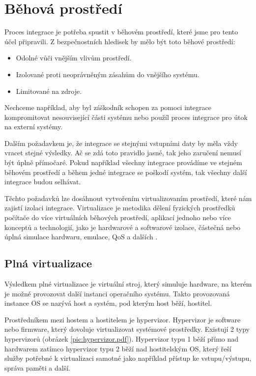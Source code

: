 \chapter{Běhová prostředí}

Proces integrace je potřeba spustit v běhovém prostředí, které jsme pro tento účel připravili.
Z bezpečnostních hledisek by mělo být toto běhové prostředí:

\begin{itemize}
	\item Odolné vůči vnějším vlivům prostředí.
	\item Izolované proti neoprávněným zásahům do vnějšího systému.
	\item Limitované na zdroje.
\end{itemize}

Nechceme například, aby byl záškodník schopen za pomoci integrace kompromitovat nesouvisející části systému nebo použíl proces integrace pro útok na externí systémy.

Dalším požadavkem je, že integrace se stejnými vstupními daty by měla vždy vracet stejné výsledky.
Ač se zdá toto pravidlo jasné, tak jeho zaručení nemusí být úplně přímočaré.
Pokud například všechny integrace provádíme ve stejném běhovém prostředí a během jedné integrace se poškodí systém, tak všechny další integrace budou selhávat.

Těchto požadavků lze dosáhnout vytvořením virtualizovaním prostředí, které nám zajistí izolaci integrace.
Virtualizace je metodika dělení fyzických prostředků počítače do více virtuálních běhových prostředí, aplikací jednoho nebo více konceptů a technologií, jako je hardwarové a softwarové izolace, částečná nebo úplná simulace hardwaru, emulace, QoS a dalších \cite{virt_intro}.

\section{Plná virtualizace}

Výsledkem plné virtualizace je virtuální stroj, který simuluje hardware, na kterém je možné provozovat další instanci operačního systému.
Takto provozovaná instance OS se nazývá host a systém, pod kterým host běží, hostitel.


Prostředníkem mezi hostem a hostitelem je hypervizor.
Hypervizor je software nebo firmware, který dovoluje virtualizovat systémové prostředky.
Existují 2 typy hypervizorů (obrázek \ref{pic:hypervizor.pdf}).
Hypervizor typu 1 běží přímo nad hardwarem zatímco hypervizor typu 2 běží nad hostitelským OS, který řeší služby potřebné k virtualizaci samotné jako například přístup ke vstupu/výstupu, správa paměti a další.
\cite{hypervisor_def}

